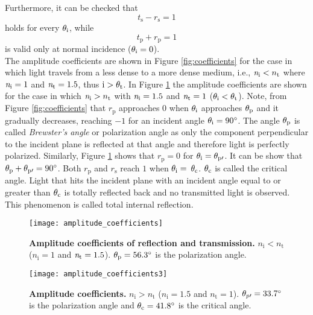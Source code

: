 Furthermore, it can be checked that
 \begin{equation}
t_\textrm{s}-r_\textrm{s} = 1
\end{equation}
holds for every $\theta_{\textrm{i}}$, while 
\begin{equation}
t_\textrm{p}+r_\textrm{p} =  1
\end{equation}
is valid only at normal incidence ($\theta_{\textrm{i}} = 0$).
\\ \indent The amplitude coefficients are shown in Figure \ref{fig:coefficients} for the case in which light travels from a less dense to a more dense medium, i.e., $\textit{n}_\textrm{i}<n_\textrm{t}$ where $\textit{n}_{\textrm{i}}= 1$ and $\textit{n}_{\textrm{t}}=1.5$, thus $\textrm{i}>\theta_\textrm{t}$. 
In Figure \ref{fig:coefficients2} the amplitude coefficients are shown for the case in which $\textit{n}_\textrm{i}>n_\textrm{t}$ with $\textit{n}_{\textrm{i}}= 1.5$ and $\textit{n}_{\textrm{t}}=1$ ($\theta_\textrm{i}<\theta_\textrm{t}$). Note, from Figure \ref{fig:coefficients} that $r_\textrm{p}$ approaches $0$ when $\theta_\textrm{i}$ approaches $\theta_\textrm{p}$ and it gradually decreases, reaching $-1$ for an incident angle $\theta_\textrm{i}=90^\circ$. The angle $\theta_\textrm{p}$ is called \textit{Brewster's angle} or polarization angle as only the component perpendicular to the incident plane is reflected at that angle and therefore light is perfectly polarized. Similarly, Figure \ref{fig:coefficients2} shows that $r_\textrm{p}=0$ for $\theta_\textrm{i}= \theta_{\textrm{p}\prime}$. It can be show that $\theta_\textrm{p}+ \theta_{\textrm{p}\prime}= 90^\circ$. Both $r_\textrm{p}$ and $r_\textrm{s}$ reach $1$ when $\theta_\textrm{i}= $ $\theta_\textrm{c}$. $\theta_\textrm{c}$ is called the critical angle. Light that hits the incident plane with an incident angle equal to or greater than $\theta_{\textrm{c}}$ is totally reflected back and no transmitted light is observed. This phenomenon is called total internal reflection. 
\begin{figure}[t]
  \begin{minipage}[h]{0.48\textwidth}
    \texttt{[image: amplitude\_coefficients]}
    \caption{\textbf{Amplitude coefficients of reflection and transmission.} $n_\textrm{i}<n_\textrm{t}$
($n_\textrm{i} = 1$ and $\textit{n}_\textrm{t}=1.5$). $\theta_\textrm{p} = 56.3^\circ$ is the polarization angle.}
    \label{fig:coefficients}
  \end{minipage}\hfill
  \begin{minipage}[h]{0.48\textwidth}
    \texttt{[image: amplitude\_coefficients3]}
    \caption{\textbf{Amplitude coefficients.} $n_\textrm{i}>n_\textrm{t}$
($n_\textrm{i} = 1.5$ and $n_\textrm{t}=1$). $\theta_{p\prime}= 33.7^\circ$ is the polarization angle and $\theta_\textrm{c}= 41.8^\circ$ is the critical angle.}
   \label{fig:coefficients2}
 \end{minipage}
\end{figure}\\
